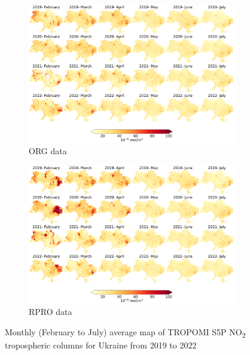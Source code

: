 \begin{figure}[p]
    \centering
    \begin{subfigure}{\textwidth}
      \centering
      \includegraphics[width=\textwidth]{figs/chap3/fig1_a.png}
      \caption{ORG data}
      \label{fig:chap3_fig1a}
    \end{subfigure}

    \begin{subfigure}{\textwidth}
      \centering
      \includegraphics[width=\textwidth]{figs/chap3/fig1_b.png}
      \caption{RPRO data}
      \label{fig:chap3_fig1b}
    \end{subfigure}
    \caption[Monthly map of S5P NO\textsubscript{2} in Ukraine]{Monthly (February to July) average map of TROPOMI S5P NO\textsubscript{2} tropospheric columns for Ukraine from 2019 to 2022}
    \label{fig:chap3_fig1}
\end{figure}

